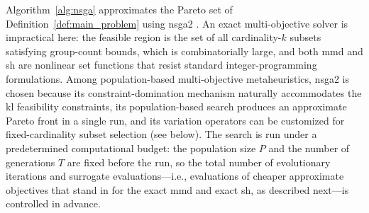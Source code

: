 \documentclass[10pt,journal]{IEEEtran}
\newcommand{\1}{\mathbf{1}}
\theoremstyle{ieeethm}
\begin{document}
Algorithm~\ref{alg:nsga} approximates the Pareto set of Definition~\ref{def:main_problem} using \gls{nsga2} \cite{deb2002nsga2}. An exact multi-objective solver is impractical here: the feasible region is the set of all cardinality-$k$ subsets satisfying group-count bounds, which is combinatorially large, and both \gls{mmd} and \gls{sh} are nonlinear set functions that resist standard integer-programming formulations. Among population-based multi-objective metaheuristics, \gls{nsga2} is chosen because its constraint-domination mechanism naturally accommodates the \gls{kl} feasibility constraints, its population-based search produces an approximate Pareto front in a single run, and its variation operators can be customized for fixed-cardinality subset selection (see below). The search is run under a predetermined computational budget: the population size $P$ and the number of generations $T$ are fixed before the run, so the total number of evolutionary iterations and surrogate evaluations---i.e., evaluations of cheaper approximate objectives that stand in for the exact \gls{mmd} and exact \gls{sh}, as described next---is controlled in advance.
\end{document}
